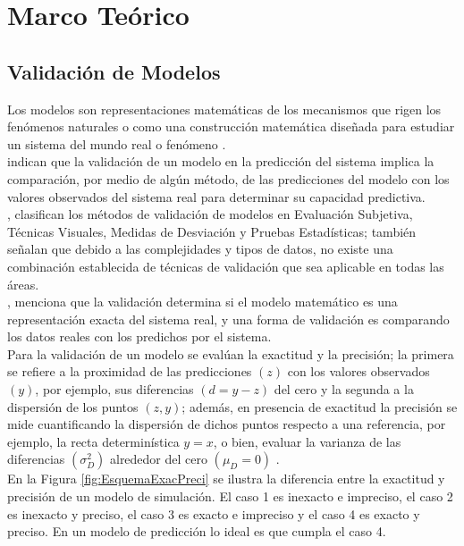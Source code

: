 \section{Marco Teórico}

\subsection{Validación de Modelos}
Los modelos son representaciones matemáticas de los mecanismos que rigen los fenómenos naturales \parencite{tedeschi-2006} o como una construcción matemática diseñada para estudiar un sistema del mundo real o fenómeno \parencite{giordano-1997}.\\

\textcite{medina-peralta-2017} indican que la validación de un modelo en la predicción del sistema implica la comparación, por medio de algún método, de las predicciones del modelo con los valores observados del sistema real para determinar su capacidad predictiva.\\

\textcite{mayer-butler-1993}, clasifican los métodos de validación de modelos en Evaluación Subjetiva, Técnicas Visuales, Medidas de Desviación y Pruebas Estadísticas; también señalan que debido a las complejidades y tipos de datos, no existe una combinación establecida de técnicas de validación que sea aplicable en todas las áreas.\\

\textcite{halachmi-2004}, menciona que la validación determina si el modelo matemático es una representación exacta del sistema real, y una forma de validación es comparando los datos reales con los predichos por el sistema.\\

Para la validación de un modelo se evalúan la exactitud y la precisión; la primera se refiere a la proximidad de las predicciones $( z )$  con los valores observados $( y )$, por ejemplo, sus diferencias $ ( d=y-z ) $ del cero y la segunda a la dispersión de los puntos $ (z, y) $; además, en presencia de exactitud la precisión se mide cuantificando la dispersión de dichos puntos respecto a una referencia, por ejemplo, la recta determinística  $ y=x $, o bien, evaluar la varianza de las diferencias $ (\sigma_{D}^{2}) $ alrededor del cero $ (\mu_{D}=0) $ \parencite{medina-peralta-2017}.\\


En la Figura \ref{fig:EsquemaExacPreci} se ilustra la diferencia entre la exactitud y precisión de un modelo de simulación. El caso 1 es inexacto e impreciso, el caso 2 es inexacto y preciso, el caso 3 es exacto e impreciso y el caso 4 es exacto y preciso. En un modelo de predicción lo ideal es que cumpla el caso 4. 

